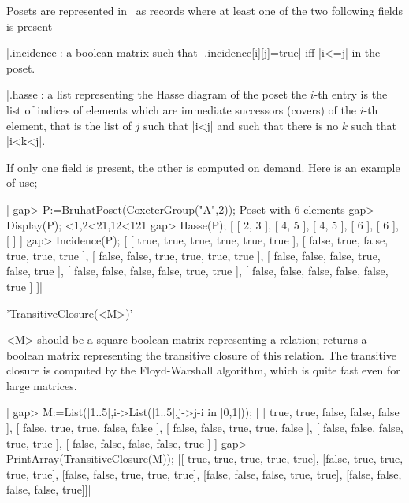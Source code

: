 

Posets are represented in \CHEVIE\ as records where at least one of the two
following fields is present\:

  |.incidence|:  a  boolean  matrix  such  that |.incidence[i][j]=true| iff
  |i<=j| in the poset.

  |.hasse|: a list representing the Hasse diagram of the poset\: the $i$-th
  entry  is the list of indices  of elements which are immediate successors
  (covers)  of the $i$-th element, that is  the list of $j$ such that |i<j|
  and such that there is no $k$ such that |i<k<j|.

If  only one field is present, the other  is computed on demand. Here is an
example of use;

|    gap> P:=BruhatPoset(CoxeterGroup("A",2));
    Poset with 6 elements
    gap> Display(P);
    <1,2<21,12<121
    gap> Hasse(P);
    [ [ 2, 3 ], [ 4, 5 ], [ 4, 5 ], [ 6 ], [ 6 ], [  ] ]
    gap> Incidence(P);   
    [ [ true, true, true, true, true, true ], 
      [ false, true, false, true, true, true ], 
      [ false, false, true, true, true, true ], 
      [ false, false, false, true, false, true ], 
      [ false, false, false, false, true, true ], 
      [ false, false, false, false, false, true ] ]|

%

'TransitiveClosure(<M>)'

<M>  should be a  square boolean matrix  representing a relation; returns a
boolean  matrix representing the  transitive closure of  this relation. The
transitive  closure is computed  by the Floyd-Warshall  algorithm, which is
quite fast even for large matrices.

|    gap> M:=List([1..5],i->List([1..5],j->j-i in [0,1]));
    [ [ true, true, false, false, false ], 
      [ false, true, true, false, false ], 
      [ false, false, true, true, false ], 
      [ false, false, false, true, true ], 
      [ false, false, false, false, true ] ]
    gap> PrintArray(TransitiveClosure(M));
    [[ true,  true,  true,  true,  true],
     [false,  true,  true,  true,  true],
     [false, false,  true,  true,  true],
     [false, false, false,  true,  true],
     [false, false, false, false,  true]]|

